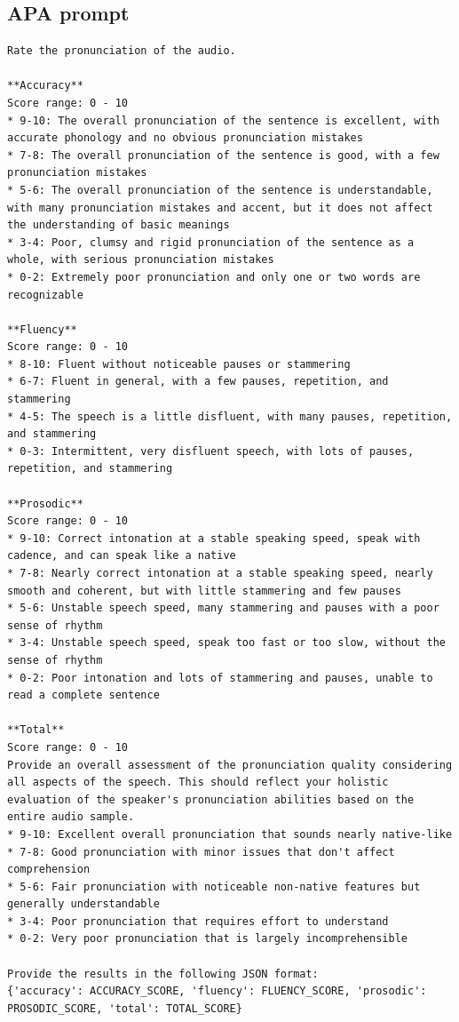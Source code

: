\documentclass[sigconf,nonacm]{acmart}
\begin{document}
\subsection{APA prompt}\label{app:apa-speechocean}
\begin{lstlisting}
Rate the pronunciation of the audio.

**Accuracy**
Score range: 0 - 10
* 9-10: The overall pronunciation of the sentence is excellent, with accurate phonology and no obvious pronunciation mistakes
* 7-8: The overall pronunciation of the sentence is good, with a few pronunciation mistakes
* 5-6: The overall pronunciation of the sentence is understandable, with many pronunciation mistakes and accent, but it does not affect the understanding of basic meanings
* 3-4: Poor, clumsy and rigid pronunciation of the sentence as a whole, with serious pronunciation mistakes
* 0-2: Extremely poor pronunciation and only one or two words are recognizable

**Fluency**
Score range: 0 - 10
* 8-10: Fluent without noticeable pauses or stammering
* 6-7: Fluent in general, with a few pauses, repetition, and stammering
* 4-5: The speech is a little disfluent, with many pauses, repetition, and stammering
* 0-3: Intermittent, very disfluent speech, with lots of pauses, repetition, and stammering

**Prosodic**
Score range: 0 - 10
* 9-10: Correct intonation at a stable speaking speed, speak with cadence, and can speak like a native
* 7-8: Nearly correct intonation at a stable speaking speed, nearly smooth and coherent, but with little stammering and few pauses
* 5-6: Unstable speech speed, many stammering and pauses with a poor sense of rhythm
* 3-4: Unstable speech speed, speak too fast or too slow, without the sense of rhythm
* 0-2: Poor intonation and lots of stammering and pauses, unable to read a complete sentence

**Total**
Score range: 0 - 10
Provide an overall assessment of the pronunciation quality considering all aspects of the speech. This should reflect your holistic evaluation of the speaker's pronunciation abilities based on the entire audio sample.
* 9-10: Excellent overall pronunciation that sounds nearly native-like
* 7-8: Good pronunciation with minor issues that don't affect comprehension
* 5-6: Fair pronunciation with noticeable non-native features but generally understandable
* 3-4: Poor pronunciation that requires effort to understand
* 0-2: Very poor pronunciation that is largely incomprehensible

Provide the results in the following JSON format:
{'accuracy': ACCURACY_SCORE, 'fluency': FLUENCY_SCORE, 'prosodic': PROSODIC_SCORE, 'total': TOTAL_SCORE}

\end{lstlisting}
\end{document}
